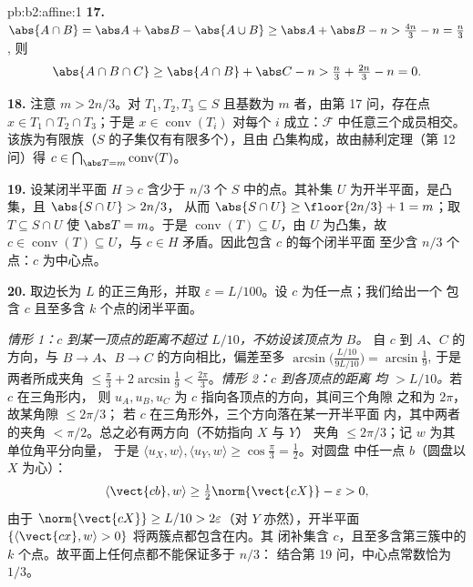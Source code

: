 \begin{solution}{pb:b2:affine:1}
\textbf{17.} $\abs{A \cap B} = \abs A + \abs B - \abs{A \cup
B} \geq \abs A + \abs B - n > \tfrac{4n}3 - n = \tfrac n3$,
则
\[
\abs{A \cap B \cap C} \geq \abs{A \cap B} + \abs C - n >
\tfrac n3 + \tfrac{2n}3 - n = 0 .
\]

\textbf{18.} 注意 $m > 2n/3$。对 $T_1, T_2, T_3 \subseteq S$
且基数为 $m$ 者，由第 17 问，存在点 $x \in T_1
\cap T_2 \cap T_3$；于是 $x \in \operatorname{conv}(T_i)$
对每个 $i$ 成立：$\mathcal F$ 中任意三个成员相交。
该族为有限族（$S$ 的子集仅有有限多个），且由
凸集构成，故由赫利定理（第 12 问）得 $c \in
\bigcap_{\abs T = m}\operatorname{conv}(T)$。

\textbf{19.} 设某闭半平面 $H \ni c$
含少于 $n/3$ 个 $S$ 中的点。其补集 $U$
为开半平面，是凸集，且 $\abs{S \cap U} > 2n/3$，
从而 $\abs{S \cap U} \geq \floor{2n/3} + 1 = m$；取 $T
\subseteq S \cap U$ 使 $\abs T = m$。于是
$\operatorname{conv}(T) \subseteq U$，由 $U$ 为凸集，故
$c \in \operatorname{conv}(T) \subseteq U$，与
$c \in H$ 矛盾。因此包含 $c$ 的每个闭半平面
至少含 $n/3$ 个点：$c$ 为中心点。

\textbf{20.} 取边长为 $L$ 的正三角形，并取
$\varepsilon = L/100$。设 $c$ 为任一点；我们给出一个
包含 $c$ 且至多含 $k$ 个点的闭半平面。

\emph{情形 1：$c$ 到某一顶点的距离不超过 $L/10$，不妨设该顶点为 $B$。}
自 $c$ 到 $A$、$C$ 的方向，与
$B \to A$、$B \to C$ 的方向相比，偏差至多
$\arcsin\bigl(\tfrac{L/10}{9L/10}\bigr) = \arcsin\tfrac19$,
于是两者所成夹角 $\leq \tfrac\pi3 + 2\arcsin\tfrac19 <
\tfrac{2\pi}3$。\emph{情形 2：$c$ 到各顶点的距离
均 $> L/10$。}若 $c$ 在三角形内，
则 $u_A, u_B, u_C$ 为 $c$ 指向各顶点的方向，其间三个角隙
之和为 $2\pi$，故某角隙 $\leq 2\pi/3$；
若 $c$ 在三角形外，三个方向落在某一开半平面
内，其中两者的夹角 $<
\pi/2$。总之必有两方向（不妨指向 $X$ 与 $Y$）
夹角 $\leq 2\pi/3$；记 $w$ 为其单位角平分向量，
于是 $\langle u_X, w\rangle, \langle u_Y, w\rangle \geq
\cos\tfrac\pi3 = \tfrac12$。对圆盘
中任一点 $b$（圆盘以 $X$ 为心）：
\[
\langle \vect{cb}, w\rangle \geq
\tfrac12\norm{\vect{cX}} - \varepsilon > 0,
\]
由于 $\norm{\vect{cX}} \geq L/10 > 2\varepsilon$（对
$Y$ 亦然），开半平面 $\{\langle \vect{cx},
w\rangle > 0\}$ 将两簇点都包含在内。其
闭补集含 $c$，且至多含第三簇中的
$k$ 个点。故平面上任何点都不能保证多于 $n/3$：
结合第 19 问，中心点常数恰为 $1/3$。


\end{solution}
